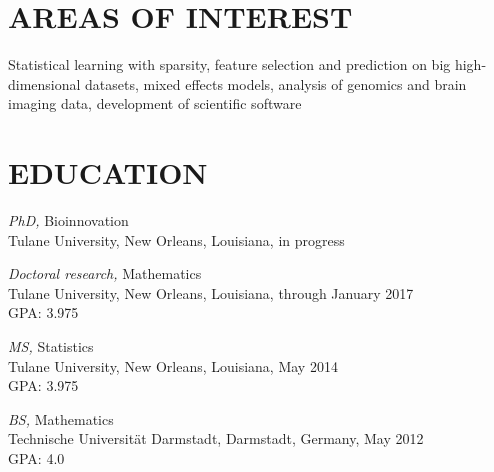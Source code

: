 \documentclass[margin]{res} %
\begin{document}
\begin{resume}
%
%
%
%

\section{AREAS OF INTEREST}

Statistical learning with sparsity, feature selection and prediction on big high-dimensional datasets, mixed effects models, analysis of genomics and brain imaging data, development of scientific software


\section{EDUCATION}

{\sl PhD,} Bioinnovation \\
Tulane University, New Orleans, Louisiana, in progress

{\sl Doctoral research,} Mathematics \\
Tulane University, New Orleans, Louisiana, through January 2017\\
GPA: 3.975

{\sl MS,} Statistics \\
Tulane University, New Orleans, Louisiana, May 2014\\
GPA: 3.975

{\sl BS,} Mathematics\\
Technische Universit\"{a}t Darmstadt, Darmstadt, Germany, May 2012\\
GPA: 4.0


\end{resume}
\end{document}
